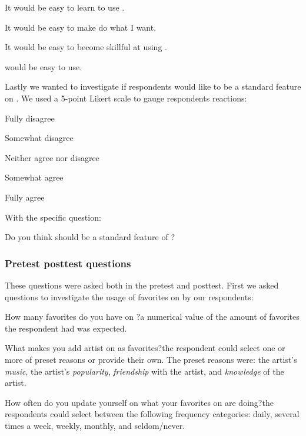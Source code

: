 \begin{items}
  \item It would be easy to learn to use \latest{}.
  \item It would be easy to make \latest{} do what I want.
  \item It would be easy to become skillful at using \latest{}.
  \item \latest{} would be easy to use.
\end{items}

Lastly we wanted to investigate if respondents would like \latest{} to be a
standard feature on \urort{}.
We used a 5-point Likert scale \citep{likert32} to gauge respondents
reactions:

\begin{items}
  \item Fully disagree
  \item Somewhat disagree
  \item Neither agree nor disagree
  \item Somewhat agree
  \item Fully agree
\end{items}

With the specific question:

\begin{items}
  \item Do you think \latest{} should be a standard feature of \urort{}?
\end{items}

\subsubsection{Pretest \oldand posttest questions}

These questions were asked both in the pretest and posttest. First we asked
questions to investigate the usage of favorites on \urort{} by our
respondents:

\begin{items}
  \item How many favorites do you have on \urort{}?\dash{}a numerical value
    of the amount of favorites the respondent had was expected.
  \item What makes you add artist on \urort{} as favorites?\dash{}the
    respondent could select one or more of preset reasons or provide their
    own. The preset reasons were: the artist's \emph{music},
    the artist's \emph{popularity}, \emph{friendship} with the artist,
    and \emph{knowledge} of the artist.
  \item How often do you update yourself on what your favorites on \urort{}
    are doing?\dash{}the respondents could select between the following
    frequency categories: daily, several times a week, weekly, monthly,
    and seldom/never.
\end{items}

